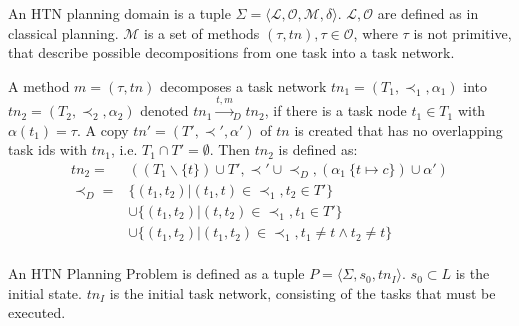 \begin{definition}
  An HTN planning domain is a tuple $\Sigma=\langle \mathcal{L}, \mathcal{O}, \mathcal{M}, \delta \rangle$.
  $\mathcal{L},\mathcal{O}$ are defined as in classical planning. 
  $\mathcal{M}$ is a set of methods $(\tau,tn), \tau \in \mathcal{O}$, where $\tau$ is not primitive, that describe possible decompositions from one task into a task network.
\end{definition}


\begin{definition}
  A method $m = (\tau,tn)$ decomposes a task network $tn_1 = (T_1,\prec_1,\alpha_1)$ into $tn_2 = (T_2,\prec_2,\alpha_2)$ denoted $tn_1 \xrightarrow{t,m}_D tn_2$, if there is a task node $t_1 \in T_1$ with $\alpha(t_1) = \tau$.
  A copy $tn' = (T',\prec',\alpha')$ of $tn$ is created that has no overlapping task ids with $tn_1$, i.e. $T_1 \cap T' = \emptyset$.
  Then $tn_2$ is defined as:
  \begin{align*}
    tn_2 = & ((T_1 \backslash  \{t\}) \cup T', \prec' \cup \prec_D, (\alpha_1 \ \{t \mapsto c\}) \cup \alpha') \\
    \prec_D = & \{(t_1, t_2) | (t_1, t) \in \prec_1, t_2 \in T'\} \\
    &\cup  \{(t_1, t_2) | (t, t_2) \in \prec_1, t_1 \in T '\} \\
    &\cup  \{(t_1, t_2) | (t_1, t_2) \in \prec_1, t_1 \neq t \land t_2 \neq t\}\\
  \end{align*}
  \label{def:htn-task-dec}
\end{definition}

\begin{definition}
  An HTN Planning Problem is defined as a tuple $P=\langle \Sigma, s_0, tn_I \rangle$.
  $s_0 \subset L$ is the initial state.
  $tn_I$ is the initial task network, consisting of the tasks that must be executed.
\end{definition}



